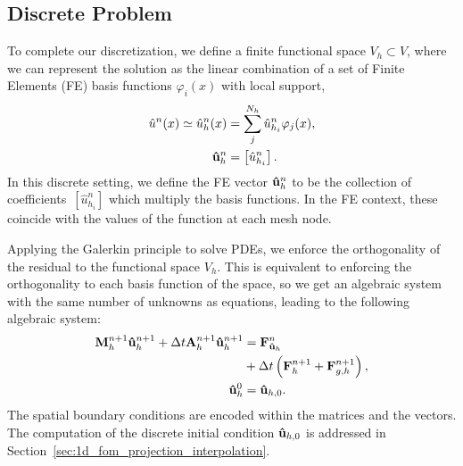 \documentclass[../main.tex]{subfiles}
\begin{document}
\subsection{Discrete Problem}
To complete our discretization, we define a finite functional space $V_h \subset V$, where we can represent the solution as the linear combination of a set of Finite Elements (FE) basis functions $\varphi_i(x)$ with local support,
\begin{align}
    \hat{u}^{n}(x) \simeq \hat{u}_h^n(x) &= \sum_j^{N_h} \hat{u}_{h_i}^n \varphi_j(x), \\
    \vb{\hat{u}}_h^{n} &= \left[\hat{u}_{h_i}^n\right].
\end{align}
In this discrete setting, we define the FE vector $\vb{\hat{u}}_h^{n}$ to be the collection of coefficients~$[\hat{u}_{h_i}^n]$ which multiply the basis functions.
In the FE context, these coincide with the values of the function at each mesh node.

Applying the Galerkin principle to solve PDEs, we enforce the orthogonality of the residual to the functional space $V_h$. 
This is equivalent to enforcing the orthogonality to each basis function of the space, so we get an algebraic system with the same number of unknowns as equations, leading to the following algebraic system:
\begin{subequations}
    \begin{align}
        \label{eq:1d_fom_weak_formulation_discrete}
        \vb{M}^{n+1}_h \vb{\hat{u}}_{h}^{n+1} + \Delta t \vb{A}^{n+1}_h \vb{\hat{u}}_{h}^{n+1} &= \vb{F}^{n}_{\vb{\hat{u}}_h} \\
        &+ \Delta t \left(\vb{F}_h^{n+1} + \vb{F}_{g,h}^{n+1}\right), \nonumber \\
        \vb{\hat{u}}_h^{0} &= \vb{\hat{u}}_{h,0}.
    \end{align}
\end{subequations}
The spatial boundary conditions are encoded within the matrices and the vectors. 
The computation of the discrete initial condition $\vb{\hat{u}}_{h,0}$ is addressed in Section~\ref{sec:1d_fom_projection_interpolation}.
\end{document}
